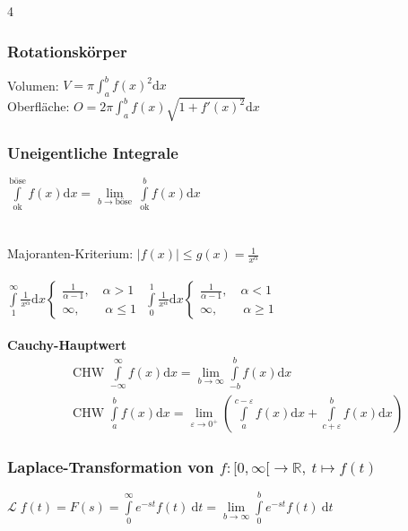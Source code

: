 \documentclass[6pt,a4paper]{scrartcl}
\newcommand{\enbrace}[1]{\ensuremath{\left(#1\right)}}
\newcommand{\ra}[0]{\ensuremath{\rightarrow}}
\begin{document}
\begin{multicols*}{4}
    \subsubsection{Rotationskörper}
    Volumen: $V = \pi \int_a^b f(x)^2 \mathrm dx$\\
    Oberfläche: $O = 2 \pi \int_a^b f(x) \sqrt{1 + f'(x)^2} \mathrm dx$

    \subsubsection{Uneigentliche Integrale}
    $\int\limits_{\text{ok}}^{\text{böse}} f(x) \mathrm dx = \lim\limits_{b\rightarrow \text{böse}}\ \int\limits_{\text{ok}}^b f(x) \mathrm dx$\\ \\ \\
    Majoranten-Kriterium: $|f(x)|\le g(x) = \frac1{x^\alpha}$\\ \\
    $\int\limits_{1}^{\infty} \frac{1}{x^\alpha} \mathrm dx \begin{cases} \frac{1}{\alpha -1}, \quad \alpha > 1 \\ \infty, \qquad \alpha \le 1 \end{cases}$ \qquad
    $\int\limits_{0}^{1} \frac{1}{x^\alpha} \mathrm dx \begin{cases} \frac{1}{\alpha -1}, \quad \alpha < 1 \\ \infty, \qquad \alpha \ge 1 \end{cases}$\\ \\
    \textbf{Cauchy-Hauptwert}
    \begin{eqnarray*}
        & \text{CHW }\int\limits_{-\infty}^{\infty} f(x) \mathrm dx = \lim\limits_{b\rightarrow\infty} \int\limits_{-b}^b f(x) \mathrm dx \\
        & \text{CHW }\int\limits_{a}^{b} f(x) \mathrm dx=\lim\limits_{\varepsilon \rightarrow 0^+}\enbrace{\int\limits_{a}^{c-\varepsilon} f(x) \mathrm dx+\int\limits_{c+\varepsilon}^{b}f(x)\mathrm dx}
    \end{eqnarray*}

    \subsubsection{Laplace-Transformation von $f: [0,\infty[ \ra \mathbb R,\ t \mapsto f(t)$}
    $\mathcal L \; f(t) = F(s) = \int\limits_{0}^{\infty} e^{-st} f(t)\ \mathrm dt = \lim\limits_{b \ra \infty} \int\limits_{0}^{b} e^{-st} f(t)\ \mathrm dt$


\end{multicols*}
\end{document}
